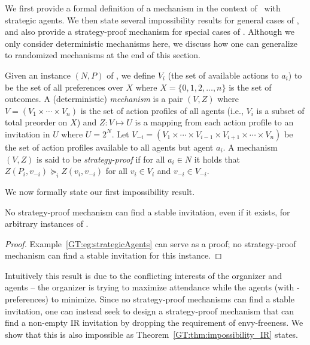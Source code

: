 We first provide a formal definition of a mechanism in the context of \ASIP\ with strategic agents. 
We then state several impossibility results for general cases of \ASIP, and also provide a strategy-proof mechanism for special cases of \ASIP.  Although we only consider deterministic mechanisms here, we discuss how one can generalize to randomized mechanisms at the end of this section.

\begin{definition} \label{GT:def:mechanism}
Given an instance $(N, P)$ of \ASIP, we define $V_i$ (the set of available actions to $a_i$) to be the set of all preferences over $X$ where $X = \{0, 1, 2, \dots, n\}$ is the set of outcomes. 
A (deterministic) \emph{mechanism} is a pair $(V, Z)$ where $V = (V_1 \times \cdots \times V_n)$ is the set of action profiles of all agents (i.e., $V_i$ is a subset of total preorder on $X$) and $Z: V \mapsto U$ is a mapping from each action profile to an invitation in $U$ where $U = 2^{N}$. 
Let $V_{-i} = (V_1 \times \cdots \times V_{i-1} \times V_{i+1} \times \cdots \times V_{n})$ be the set of action profiles available to all agents but agent $a_i$. A mechanism $(V, Z)$ is said to be \emph{strategy-proof} if for all $a_i\in N$ it holds that $Z(P_i, v_{-i}) \succeq_i Z(v_i, v_{-i})$ for all $v_i \in V_i$ and $v_{-i} \in V_{-i}$.
\end{definition}
We now formally state our first impossibility result.
\begin{theorem} \label{GT:thm:impossibility}
No strategy-proof mechanism can find a stable invitation, even if it exists, for arbitrary instances of \ASIP.
\end{theorem}
\begin{proof}
Example~\ref{GT:eg:strategicAgents} can serve as a proof; no strategy-proof mechanism can find a stable invitation for this instance.  
\end{proof}
Intuitively this result is due to the conflicting interests of the organizer and agents -- the organizer is trying to maximize attendance while the agents (with \DEC-preferences) to minimize. 
Since no strategy-proof mechanisms can find a stable invitation, 
one can instead seek to design a strategy-proof mechanism that can find a non-empty IR invitation 
by dropping the requirement of envy-freeness.
We show that this is also impossible as Theorem~\ref{GT:thm:impossibility_IR} states.

